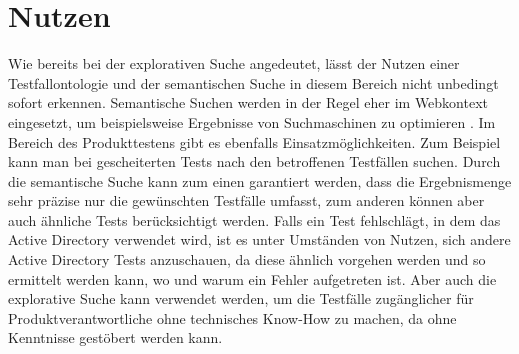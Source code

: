 \section{Nutzen}
Wie bereits bei der explorativen Suche angedeutet, lässt der Nutzen einer Testfallontologie und der semantischen Suche in diesem Bereich nicht unbedingt sofort erkennen. Semantische Suchen werden in der Regel eher im Webkontext eingesetzt, um beispielsweise Ergebnisse von Suchmaschinen zu optimieren \cite{Sack.2010}.\newline
Im Bereich des Produkttestens gibt es ebenfalls Einsatzmöglichkeiten. Zum Beispiel kann man bei gescheiterten Tests nach den betroffenen Testfällen suchen. Durch die semantische Suche kann zum einen garantiert werden, dass die Ergebnismenge sehr präzise nur die gewünschten Testfälle umfasst, zum anderen können aber auch ähnliche Tests berücksichtigt werden. Falls ein Test fehlschlägt, in dem das Active Directory verwendet wird, ist es unter Umständen von Nutzen, sich andere Active Directory Tests anzuschauen, da diese ähnlich vorgehen werden und so ermittelt werden kann, wo und warum ein Fehler aufgetreten ist. Aber auch die explorative Suche kann verwendet werden, um die Testfälle zugänglicher für Produktverantwortliche ohne technisches Know-How zu machen, da ohne Kenntnisse \glqq gestöbert\grqq{} werden kann. 
